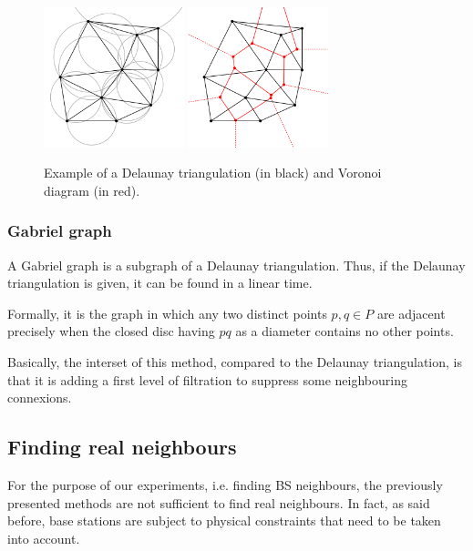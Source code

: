 \documentclass[lettersize,journal,english]{IEEEtran}
\begin{document}
            \begin{figure}
                \centering
                \includegraphics[width=1.6in]{images/illus_graphs/Delaunay_circumcircles_vectorial.png}
                \includegraphics[width=1.6in]{images/illus_graphs/Delaunay_Voronoi.png}
                \caption{Example of a Delaunay triangulation (in black) and Voronoi diagram (in red).}
                \label{fig:del_tri}
            \end{figure}

        \subsubsection{Gabriel graph}
            A Gabriel graph \cite{10.2307/2412323} is a subgraph of a Delaunay triangulation. Thus, if the Delaunay triangulation is given, it can be found in a linear time. 

            Formally, it is the graph in which any two distinct points $p, q \in P$ are adjacent precisely when the closed disc having $pq$ as a diameter contains no other points.

            Basically, the interset of this method, compared to the Delaunay triangulation, is that it is adding a first level of filtration to suppress some neighbouring connexions.

    \subsection{Finding real neighbours}
        For the purpose of our experiments, i.e. finding BS neighbours, the previously presented methods are not sufficient to find real neighbours. In fact, as said before, base stations are subject to physical constraints that need to be taken into account.
\end{document}
